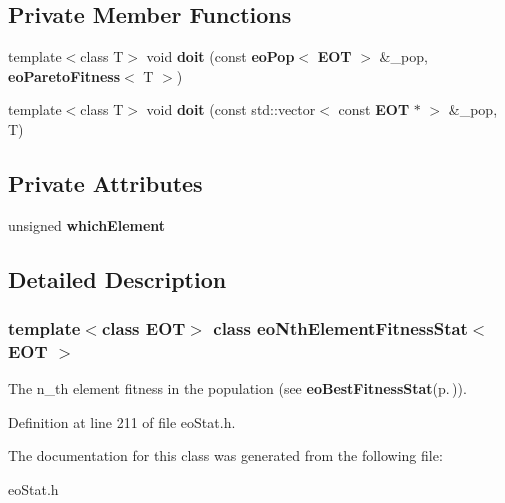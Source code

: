 \subsection*{Private Member Functions}
\begin{CompactItemize}
\item 
template$<$class T$>$ void {\bf doit} (const {\bf eo\-Pop}$<$ {\bf EOT} $>$ \&\_\-pop, {\bf eo\-Pareto\-Fitness}$<$ T $>$)\label{classeo_nth_element_fitness_stat_d0}

\item 
template$<$class T$>$ void {\bf doit} (const std::vector$<$ const {\bf EOT} $\ast$ $>$ \&\_\-pop, T)\label{classeo_nth_element_fitness_stat_d1}

\end{CompactItemize}
\subsection*{Private Attributes}
\begin{CompactItemize}
\item 
unsigned {\bf which\-Element}\label{classeo_nth_element_fitness_stat_r0}

\end{CompactItemize}


\subsection{Detailed Description}
\subsubsection*{template$<$class EOT$>$ class eo\-Nth\-Element\-Fitness\-Stat$<$ EOT $>$}

The n\_\-th element fitness in the population (see {\bf eo\-Best\-Fitness\-Stat}{\rm (p.\,\pageref{classeo_best_fitness_stat})}). 



Definition at line 211 of file eo\-Stat.h.

The documentation for this class was generated from the following file:\begin{CompactItemize}
\item 
eo\-Stat.h\end{CompactItemize}
